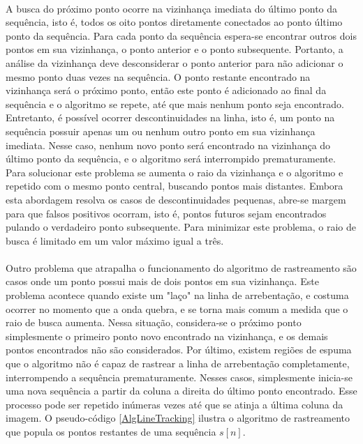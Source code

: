 \paragraph{}A busca do próximo ponto ocorre na vizinhança imediata do último ponto da sequência, isto é, todos os oito pontos diretamente conectados ao ponto último ponto da sequência. Para cada ponto da sequência espera-se encontrar outros dois pontos em sua vizinhança, o ponto anterior e o ponto subsequente. Portanto, a análise da vizinhança deve desconsiderar o ponto anterior para não adicionar o mesmo ponto duas vezes na sequência. O ponto restante encontrado na vizinhança será o próximo ponto, então este ponto é adicionado ao final da sequência e o algoritmo se repete, até que mais nenhum ponto seja encontrado. Entretanto, é possível ocorrer descontinuidades na linha, isto é, um ponto na sequência possuir apenas um ou nenhum outro ponto em sua vizinhança imediata. Nesse caso, nenhum novo ponto será encontrado na vizinhança do último ponto da sequência, e o algoritmo será interrompido prematuramente. Para solucionar este problema se aumenta o raio da vizinhança e o algoritmo e repetido com o mesmo ponto central, buscando pontos mais distantes. Embora esta abordagem resolva os casos de descontinuidades pequenas, abre-se margem para que falsos positivos ocorram, isto é, pontos futuros sejam encontrados pulando o verdadeiro ponto subsequente. Para minimizar este problema, o raio de busca é limitado em um valor máximo igual a três.

\paragraph{}Outro problema que atrapalha o funcionamento do algoritmo de rastreamento são casos onde um ponto possui mais de dois pontos em sua vizinhança. Este problema acontece quando existe um "laço" na linha de arrebentação, e costuma ocorrer no momento que a onda quebra, e se torna mais comum a medida que o raio de busca aumenta. Nessa situação, considera-se o próximo ponto simplesmente o primeiro ponto novo encontrado na vizinhança, e os demais pontos encontrados não são considerados. Por último, existem regiões de espuma que o algoritmo não é capaz de rastrear a linha de arrebentação completamente, interrompendo a sequência prematuramente. Nesses casos, simplesmente inicia-se uma nova sequência a partir da coluna a direita do último ponto encontrado. Esse processo pode ser repetido inúmeras vezes até que se atinja a última coluna da imagem. O pseudo-código \ref{AlgLineTracking} ilustra o algoritmo de rastreamento que popula os pontos restantes de uma sequência $s[n]$.


